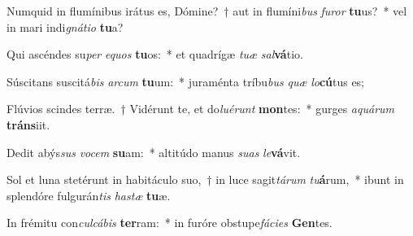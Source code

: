 \item Numquid in flumínibus irátus es, Dómine?~† aut in flumíni\textit{bus} \textit{fu}\textit{ror} \textbf{tu}us?~* vel in mari indi\textit{gná}\textit{ti}\textit{o} \textbf{tu}a?
\item Qui ascéndes su\textit{per} \textit{e}\textit{quos} \textbf{tu}os:~* et quadrígæ \textit{tu}\textit{æ} \textit{sal}\textbf{vá}tio.
\item Súscitans suscitá\textit{bis} \textit{ar}\textit{cum} \textbf{tu}um:~* juraménta tríbu\textit{bus} \textit{quæ} \textit{lo}\textbf{cú}tus es;
\item Flúvios scindes terræ.~† Vidérunt te, et do\textit{lu}\textit{é}\textit{runt} \textbf{mon}tes:~* gurges \textit{a}\textit{quá}\textit{rum} \textbf{tráns}iit.
\item Dedit abýs\textit{sus} \textit{vo}\textit{cem} \textbf{su}am:~* altitúdo manus \textit{su}\textit{as} \textit{le}\textbf{vá}vit.
\item Sol et luna stetérunt in habitáculo suo,~† in luce sagit\textit{tá}\textit{rum} \textit{tu}\textbf{á}rum,~* ibunt in splendóre fulgurán\textit{tis} \textit{has}\textit{tæ} \textbf{tu}æ.
\item In frémitu con\textit{cul}\textit{cá}\textit{bis} \textbf{ter}ram:~* in furóre obstupe\textit{fá}\textit{ci}\textit{es} \textbf{Gen}tes.
